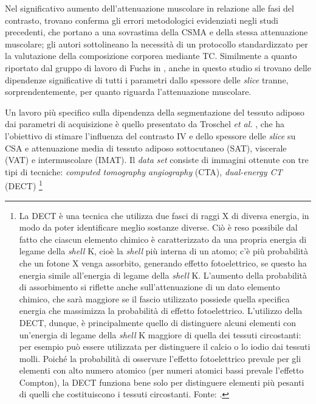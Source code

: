 Nel significativo aumento dell'attenuazione muscolare in relazione alle fasi del contrasto, trovano conferma gli errori metodologici evidenziati negli studi precedenti, che portano a una sovrastima della CSMA e della stessa attenuazione muscolare; gli autori sottolineano la necessità di un protocollo standardizzato per la valutazione della composizione corporea mediante TC. Similmente a quanto riportato dal gruppo di lavoro di Fuchs in \cite{Fuchs2018}, anche in questo studio si trovano delle dipendenze significative di tutti i parametri dallo spessore delle \textit{slice} tranne, sorprendentemente, per quanto riguarda l’attenuazione muscolare.

Un lavoro più specifico sulla dipendenza della segmentazione del tessuto adiposo dai parametri di acquisizione è quello presentato da Troschel \textit{et al.} \cite{Troschel2021}, che ha l'obiettivo di stimare l’influenza del contrasto IV e dello spessore delle \textit{slice} su CSA e attenuazione media di tessuto adiposo sottocutaneo (SAT), viscerale (VAT) e intermuscolare (IMAT). Il \textit{data set} consiste di immagini ottenute con tre tipi di tecniche: \textit{computed tomography angiography} (CTA), \textit{dual-energy CT} (DECT)%
\footnote{La DECT è una tecnica che utilizza due fasci di raggi X di diversa energia, in modo da poter identificare meglio sostanze diverse. Ciò è reso possibile dal fatto che ciascun elemento chimico è caratterizzato da una propria energia di legame della \textit{shell} K, cioè la \textit{shell} più interna di un atomo; c’è più probabilità che un fotone X venga assorbito, generando effetto fotoelettrico, se questo ha energia simile all'energia di legame della \textit{shell} K. L’aumento della probabilità di assorbimento si riflette anche sull'attenuazione di un dato elemento chimico, che sarà maggiore se il fascio utilizzato possiede quella specifica energia che massimizza la probabilità di effetto fotoelettrico. L’utilizzo della DECT, dunque, è principalmente quello di distinguere alcuni elementi con un’energia di legame della \textit{shell} K maggiore di quella dei tessuti circostanti: per esempio può essere utilizzata per distinguere il calcio o lo iodio dai tessuti molli. Poiché la probabilità di osservare l’effetto fotoelettrico prevale per gli elementi con alto numero atomico (per numeri atomici bassi prevale l’effetto Compton), la DECT funziona bene solo per distinguere elementi più pesanti di quelli che costituiscono i tessuti circostanti. Fonte: \cite{Coursey2010}.}
